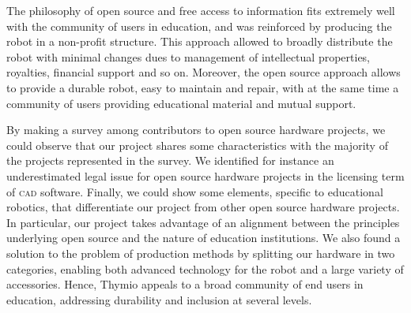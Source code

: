 \documentclass[letterpaper, 10 pt, conference]{ieeeconf}  %
\begin{document}
The philosophy of open source and free access to information fits extremely well with the community of users in education, and was reinforced by producing the robot in a non-profit structure.
This approach allowed to broadly distribute the robot with minimal changes dues to management of intellectual properties, royalties, financial support and so on.
Moreover, the open source approach allows to provide a durable robot, easy to maintain and repair, with at the same time a community of users providing educational material and mutual support.

By making a survey among contributors to open source hardware projects, we could observe that our project shares some characteristics with the majority of the projects represented in the survey. 
We identified for instance an underestimated legal issue for open source hardware projects in the licensing term of \textsc{cad} software.
Finally, we could show some elements, specific to educational robotics, that differentiate our project from other open source hardware projects.
In particular, our project takes advantage of an alignment between the principles underlying open source and the nature of education institutions. 
We also found a solution to the problem of production methods by splitting our hardware in two categories, enabling both advanced technology for the robot and a large variety of accessories.
Hence, Thymio appeals to a broad community of end users in education, addressing durability and inclusion at several levels.




\end{document}
